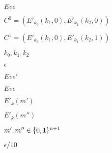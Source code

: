 \documentclass[10pt]{book}
\begin{document}
\begin{mdSnippets}
\begin{mdInlineSnippet}%
$Eve$\end{mdInlineSnippet}%
\begin{mdInlineSnippet}[57549138be1c142b8f4f433c9036f102]%
$C^0 = (E'_{k_0}(k_1,0),E'_{k_1}(k_2,0))$\end{mdInlineSnippet}%
\begin{mdInlineSnippet}[859eba2e187a39f5c1c7413d53e2c209]%
$C^1 = (E'_{k_0}(k_1,0),E'_{k_1}(k_2,1))$\end{mdInlineSnippet}%
\begin{mdInlineSnippet}[08d23c49ab9b985b0c3672033948c724]%
$k_0,k_1,k_2$\end{mdInlineSnippet}%
\begin{mdInlineSnippet}[92e4da341fe8f4cd46192f21b6ff3aa7]%
$\epsilon$\end{mdInlineSnippet}%
\begin{mdInlineSnippet}[0c3570ae86ed9d695d5d1d469a0b8bfa]%
$Eve'$\end{mdInlineSnippet}%
\begin{mdInlineSnippet}%
$Eve$\end{mdInlineSnippet}%
\begin{mdInlineSnippet}[ad5afc14e298b95279c15f4e4b6c1022]%
$E'_k(m')$\end{mdInlineSnippet}%
\begin{mdInlineSnippet}[e9ca51b645c921f374f3b8b5798e9e56]%
$E'_k(m'')$\end{mdInlineSnippet}%
\begin{mdInlineSnippet}[d2503c075bd47f548bbffc62c58ff8f1]%
$m',m''\in\{0,1\}^{n+1}$\end{mdInlineSnippet}%
\begin{mdInlineSnippet}[a18499b68e3b7c050e0a04741e013500]%
$\epsilon/10$\end{mdInlineSnippet}%

\end{mdSnippets}
\end{document}

